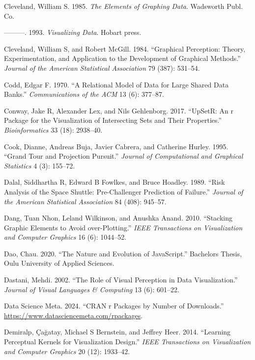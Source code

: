\documentclass[
]{book}
\newlength{\cslhangindent}
\newenvironment{CSLReferences}[2] %
 {\begin{list}{}{%
  \setlength{\itemindent}{0pt}
  \setlength{\leftmargin}{0pt}
  \setlength{\parsep}{0pt}
  \ifodd #1
   \setlength{\leftmargin}{\cslhangindent}
   \setlength{\itemindent}{-1\cslhangindent}
  \fi
  \setlength{\itemsep}{#2\baselineskip}}}
 {\end{list}}
\theoremstyle{definition}
\theoremstyle{definition}
\theoremstyle{definition}
\theoremstyle{definition}
\theoremstyle{remark}
\begin{document}
\begin{CSLReferences}{1}{0}
Cleveland, William S. 1985. \emph{The Elements of Graphing Data}. Wadsworth Publ. Co.

---------. 1993. \emph{Visualizing Data}. Hobart press.

Cleveland, William S, and Robert McGill. 1984. {``Graphical Perception: Theory, Experimentation, and Application to the Development of Graphical Methods.''} \emph{Journal of the American Statistical Association} 79 (387): 531--54.

Codd, Edgar F. 1970. {``A Relational Model of Data for Large Shared Data Banks.''} \emph{Communications of the ACM} 13 (6): 377--87.

Conway, Jake R, Alexander Lex, and Nils Gehlenborg. 2017. {``UpSetR: An r Package for the Visualization of Intersecting Sets and Their Properties.''} \emph{Bioinformatics} 33 (18): 2938--40.

Cook, Dianne, Andreas Buja, Javier Cabrera, and Catherine Hurley. 1995. {``Grand Tour and Projection Pursuit.''} \emph{Journal of Computational and Graphical Statistics} 4 (3): 155--72.

Dalal, Siddhartha R, Edward B Fowlkes, and Bruce Hoadley. 1989. {``Risk Analysis of the Space Shuttle: Pre-Challenger Prediction of Failure.''} \emph{Journal of the American Statistical Association} 84 (408): 945--57.

Dang, Tuan Nhon, Leland Wilkinson, and Anushka Anand. 2010. {``Stacking Graphic Elements to Avoid over-Plotting.''} \emph{IEEE Transactions on Visualization and Computer Graphics} 16 (6): 1044--52.

Dao, Chau. 2020. {``The Nature and Evolution of JavaScript.''} Bachelor\textquotesingle s Thesis, Oulu University of Applied Sciences.

Dastani, Mehdi. 2002. {``The Role of Visual Perception in Data Visualization.''} \emph{Journal of Visual Languages \& Computing} 13 (6): 601--22.

Data Science Meta. 2024. {``CRAN r Packages by Number of Downloads.''} \url{https://www.datasciencemeta.com/rpackages}.

Demiralp, Çağatay, Michael S Bernstein, and Jeffrey Heer. 2014. {``Learning Perceptual Kernels for Visualization Design.''} \emph{IEEE Transactions on Visualization and Computer Graphics} 20 (12): 1933--42.


\end{CSLReferences}
\end{document}
